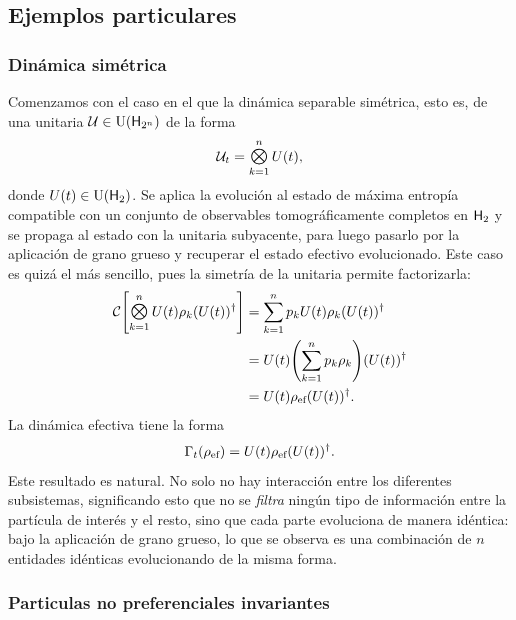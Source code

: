 \subsection{Ejemplos particulares}

\subsubsection{Dinámica simétrica}

Comenzamos con el caso en el que la dinámica separable simétrica, esto es, de una unitaria $\mathcal{U}\in\text{U}({\sf H}_{2^{n}})$ de la forma
\begin{equation}
    \mcU_{t}=\Motimes_{k=1}^{n}U(t),\nonumber
\end{equation}
donde $U(t)\in\text{U}({\sf H}_{2})$. Se aplica la evolución al estado de máxima entropía compatible con un conjunto de observables tomográficamente completos en ${\sf H}_{2}$ y se propaga al estado con la unitaria subyacente, para luego pasarlo por la aplicación de grano grueso y recuperar el estado efectivo evolucionado. Este caso es quizá el más sencillo, pues la simetría de la unitaria permite factorizarla:
\begin{align}
\mcC\qty[\Motimes_{k=1}^{n}U(t) \rho_{k} (U(t))^{\dag}]&=\sum_{k=1}^{n}p_{k} U(t) \rho_{k} (U(t))^{\dag}\nonumber \\
&=U(t)\qty(\sum_{k=1}^{n}p_{k} \rho_{k}) (U(t))^{\dag}\nonumber\\
&=U(t)\rho_{\ef}(U(t))^{\dag}.\nonumber
\end{align}
La dinámica efectiva tiene la forma
\begin{equation}
    \Gamma_{t}(\rho_{\text{ef}})=U(t)\rho_{\text{ef}}(U(t))^{\dag}.\nonumber
\end{equation}
Este resultado es natural. No solo no hay interacción entre los diferentes subsistemas, significando esto que no se \textit{filtra} ningún tipo de información entre la partícula de interés y el resto, sino que cada parte evoluciona de manera idéntica: bajo la aplicación de grano grueso, lo que se observa es una combinación de $n$ entidades idénticas evolucionando de la misma forma.

\subsubsection{Particulas no preferenciales invariantes}

